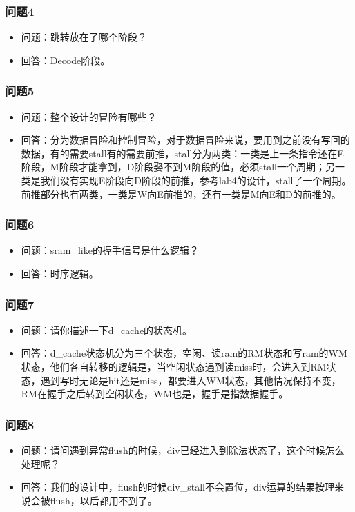 \subsubsection{问题4}
\begin{itemize}
    \item 问题：跳转放在了哪个阶段？
    \item \stunameb 回答：Decode阶段。
\end{itemize}
\subsubsection{问题5}
\begin{itemize}
    \item 问题：整个设计的冒险有哪些？
    \item \stunameb 回答：分为数据冒险和控制冒险，对于数据冒险来说，要用到之前没有写回的数据，有的需要stall有的需要前推，stall分为两类：一类是上一条指令还在E阶段，M阶段才能拿到，D阶段娶不到M阶段的值，必须stall一个周期；另一类是我们没有实现E阶段向D阶段的前推，参考lab4的设计，stall了一个周期。前推部分也有两类，一类是W向E前推的，还有一类是M向E和D的前推的。
\end{itemize}
\subsubsection{问题6}
\begin{itemize}
    \item 问题：sram\_like的握手信号是什么逻辑？
    \item \stunameb 回答：时序逻辑。
\end{itemize}
\subsubsection{问题7}
\begin{itemize}
    \item 问题：请你描述一下d\_cache的状态机。
    \item \stunameb 回答：d\_cache状态机分为三个状态，空闲、读ram的RM状态和写ram的WM状态，他们各自转移的逻辑是，当空闲状态遇到读miss时，会进入到RM状态，遇到写时无论是hit还是miss，都要进入WM状态，其他情况保持不变，RM在握手之后转到空闲状态，WM也是，握手是指数据握手。
\end{itemize}
\subsubsection{问题8}
\begin{itemize}
    \item 问题：请问遇到异常flush的时候，div已经进入到除法状态了，这个时候怎么处理呢？
    \item \stunamea 回答：我们的设计中，flush的时候div\_stall不会置位，div运算的结果按理来说会被flush，以后都用不到了。
\end{itemize}
\begin{center}
\end{center}


